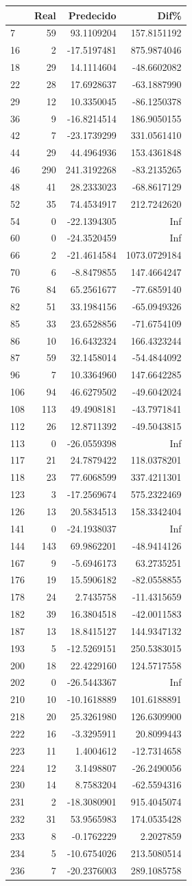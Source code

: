 \documentclass[
]{article}
\begin{document}
\begin{longtable}[]{@{}lrrr@{}}
\toprule
& Real & Predecido & Dif\%\tabularnewline
\midrule
\endhead
7 & 59 & 93.1109204 & 157.8151192\tabularnewline
16 & 2 & -17.5197481 & 875.9874046\tabularnewline
18 & 29 & 14.1114604 & -48.6602082\tabularnewline
22 & 28 & 17.6928637 & -63.1887990\tabularnewline
29 & 12 & 10.3350045 & -86.1250378\tabularnewline
36 & 9 & -16.8214514 & 186.9050155\tabularnewline
42 & 7 & -23.1739299 & 331.0561410\tabularnewline
44 & 29 & 44.4964936 & 153.4361848\tabularnewline
46 & 290 & 241.3192268 & -83.2135265\tabularnewline
48 & 41 & 28.2333023 & -68.8617129\tabularnewline
52 & 35 & 74.4534917 & 212.7242620\tabularnewline
54 & 0 & -22.1394305 & Inf\tabularnewline
60 & 0 & -24.3520459 & Inf\tabularnewline
66 & 2 & -21.4614584 & 1073.0729184\tabularnewline
70 & 6 & -8.8479855 & 147.4664247\tabularnewline
76 & 84 & 65.2561677 & -77.6859140\tabularnewline
82 & 51 & 33.1984156 & -65.0949326\tabularnewline
85 & 33 & 23.6528856 & -71.6754109\tabularnewline
86 & 10 & 16.6432324 & 166.4323244\tabularnewline
87 & 59 & 32.1458014 & -54.4844092\tabularnewline
96 & 7 & 10.3364960 & 147.6642285\tabularnewline
106 & 94 & 46.6279502 & -49.6042024\tabularnewline
108 & 113 & 49.4908181 & -43.7971841\tabularnewline
112 & 26 & 12.8711392 & -49.5043815\tabularnewline
113 & 0 & -26.0559398 & Inf\tabularnewline
117 & 21 & 24.7879422 & 118.0378201\tabularnewline
118 & 23 & 77.6068599 & 337.4211301\tabularnewline
123 & 3 & -17.2569674 & 575.2322469\tabularnewline
126 & 13 & 20.5834513 & 158.3342404\tabularnewline
141 & 0 & -24.1938037 & Inf\tabularnewline
144 & 143 & 69.9862201 & -48.9414126\tabularnewline
167 & 9 & -5.6946173 & 63.2735251\tabularnewline
176 & 19 & 15.5906182 & -82.0558855\tabularnewline
178 & 24 & 2.7435758 & -11.4315659\tabularnewline
182 & 39 & 16.3804518 & -42.0011583\tabularnewline
187 & 13 & 18.8415127 & 144.9347132\tabularnewline
193 & 5 & -12.5269151 & 250.5383015\tabularnewline
200 & 18 & 22.4229160 & 124.5717558\tabularnewline
202 & 0 & -26.5443367 & Inf\tabularnewline
210 & 10 & -10.1618889 & 101.6188891\tabularnewline
218 & 20 & 25.3261980 & 126.6309900\tabularnewline
222 & 16 & -3.3295911 & 20.8099443\tabularnewline
223 & 11 & 1.4004612 & -12.7314658\tabularnewline
224 & 12 & 3.1498807 & -26.2490056\tabularnewline
230 & 14 & 8.7583204 & -62.5594316\tabularnewline
231 & 2 & -18.3080901 & 915.4045074\tabularnewline
232 & 31 & 53.9565983 & 174.0535428\tabularnewline
233 & 8 & -0.1762229 & 2.2027859\tabularnewline
234 & 5 & -10.6754026 & 213.5080514\tabularnewline
236 & 7 & -20.2376003 & 289.1085758\tabularnewline

\end{longtable}
\end{document}
